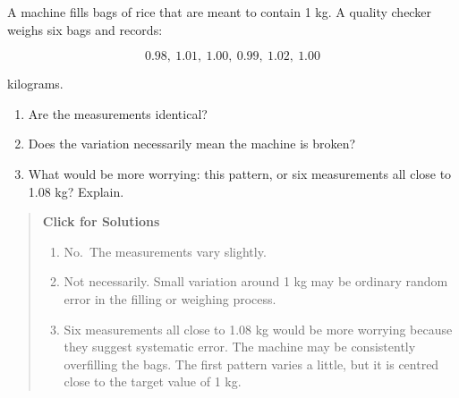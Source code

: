 \documentclass[
  letterpaper,
  DIV=11,
  numbers=noendperiod]{scrreprt}
\begin{document}
\begin{tcolorbox}[enhanced jigsaw, arc=.35mm, bottomrule=.15mm, bottomtitle=1mm, breakable, colback=white, colbacktitle=quarto-callout-note-color!10!white, colframe=quarto-callout-note-color-frame, coltitle=black, left=2mm, leftrule=.75mm, opacityback=0, opacitybacktitle=0.6, rightrule=.15mm, title=\textcolor{quarto-callout-note-color}{\faInfo}\hspace{0.5em}{Question 7}, titlerule=0mm, toprule=.15mm, toptitle=1mm]

A machine fills bags of rice that are meant to contain 1 kg. A quality
checker weighs six bags and records:

\[
0.98,\ 1.01,\ 1.00,\ 0.99,\ 1.02,\ 1.00
\]

kilograms.

\begin{enumerate}
\def\labelenumi{\alph{enumi}.}
\item
  Are the measurements identical?
\item
  Does the variation necessarily mean the machine is broken?
\item
  What would be more worrying: this pattern, or six measurements all
  close to 1.08 kg? Explain.
\end{enumerate}

\begin{quote}
\textbf{Click for Solutions}

\begin{enumerate}
\def\labelenumi{\alph{enumi}.}
\item
  No.~The measurements vary slightly.
\item
  Not necessarily. Small variation around 1 kg may be ordinary random
  error in the filling or weighing process.
\item
  Six measurements all close to 1.08 kg would be more worrying because
  they suggest systematic error. The machine may be consistently
  overfilling the bags. The first pattern varies a little, but it is
  centred close to the target value of 1 kg.
\end{enumerate}
\end{quote}

\end{tcolorbox}
\end{document}
